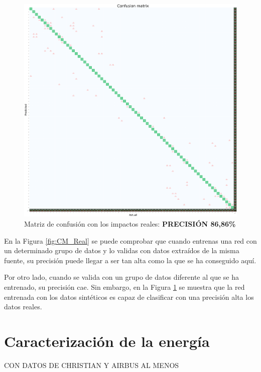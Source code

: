 \begin{figure}[H]
    \centering
    \includegraphics[width=150mm, angle=0]{4/Fotos/CM_A380_Sintetico.png}
    \captionsetup{justification=centering,margin=1.25cm}
    \caption{Matriz de confusión con los impactos reales: \textbf{PRECISIÓN 86,86\%}}
    \label{fig:CM_Sintetico}
\end{figure}

En la Figura \ref{fig:CM_Real} se puede comprobar que cuando entrenas una red con un determinado grupo de datos y lo validas con datos extraídos de la misma fuente, su precisión puede llegar a ser tan alta como la que se ha conseguido aquí.

Por otro lado, cuando se valida con un grupo de datos diferente al que se ha entrenado, su precisión cae. Sin embargo, en la Figura \ref{fig:CM_Sintetico} se muestra que la red entrenada con los datos sintéticos es capaz de clasificar con una precisión alta los datos reales.

\clearpage



\section{Caracterización de la energía}

CON DATOS DE CHRISTIAN Y AIRBUS AL MENOS

